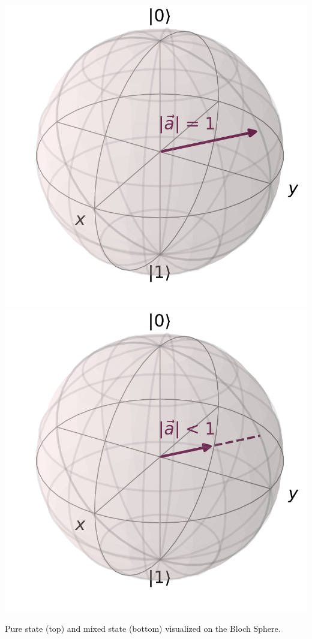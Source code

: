 \begin{marginfigure}[-11 cm]
    \centering
    \includegraphics[]{Figs/Theory/bloch_sphere_pure.pdf}
    \includegraphics[]{Figs/Theory/bloch_sphere_mixed.pdf}
    \caption{Pure state (top) and mixed state (bottom) visualized on the Bloch Sphere.}
    \label{fig:bloch_sphere_density_matrix}
\end{marginfigure}

